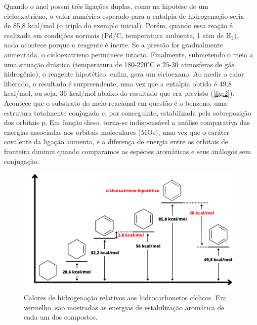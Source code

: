 Quando o anel possui três ligações duplas, como na hipotése de um cicloexatrieno, o valor numérico esperado para a entalpia de hidrogenação seria de 85,8 kcal/mol (o triplo do exemplo inicial). Porém, quando essa reação é realizada em condições normais (Pd/C, temperatura ambiente, 1 atm de H$_2$), nada acontece porque o reagente é inerte. Se a pressão for gradualmente aumentada, o cicloexatrieno permanece intacto. Finalmente, submetendo o meio a uma situação drástica (temperatura de 180-220$^\circ$C e 25-30 atmosferas de gás hidrogênio), o reagente hipotético, enfim, gera um cicloexano. Ao medir o calor liberado, o resultado é surpreendente, uma vez que a entalpia obtida é 49,8 kcal/mol, ou seja, 36 kcal/mol abaixo do resultado que era previsto (\autoref{fig:2}). Acontece que o substrato do meio reacional em questão é o benzeno, uma estrutura totalmente conjugada e, por conseguinte, estabilizada pela sobreposição dos orbitais p. Em função disso, torna-se indispensável a análise comparativa das energias associadas aos orbitais moleculares (MOs), uma vez que o caráter covalente da ligação aumenta, e a diferença de energia entre os orbitais de fronteira diminui quando comparamos as espécies aromáticas e seus análogos sem conjugação.


\begin{figure}[htb]
	\caption{\label{fig:2} Calores de hidrogenação relativos aos hidrocarbonetos cíclicos. Em vermelho, são mostradas as energias de estabilização aromática de cada um dos compostos.}
	\begin{center}
		\includegraphics[width=1.0\textwidth]{images/fig2.png}
	\end{center}
\end{figure}


